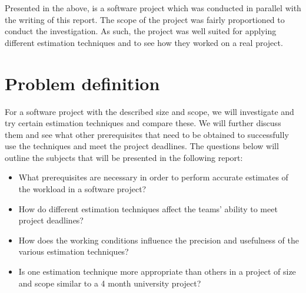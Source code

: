Presented in the above, is a software project which was conducted in parallel with the writing of this report. The scope of the project was fairly proportioned to conduct the investigation. As such, the project was well suited for applying different estimation techniques and to see how they worked on a real project.


\section{Problem definition}
For a software project with the described size and scope, we will investigate and try certain estimation techniques and compare these. We will further discuss them and see what other prerequisites that need to be obtained to successfully use the techniques and meet the project deadlines. The questions below will outline the subjects that will be presented in the following report:  
\begin{itemize}
\item What prerequisites are necessary in order to perform accurate estimates of the workload in a software project?
\item How do different estimation techniques affect the teams' ability to meet project deadlines?
\item How does the working conditions influence the precision and usefulness of the various estimation techniques?	
\item Is one estimation technique more appropriate than others in a project of size and scope similar to a 4 month university project?
\end{itemize}
\newpage


